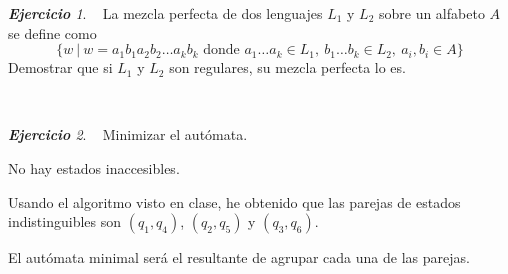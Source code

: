 \documentclass[12pt,spanish]{article}
\theoremstyle{definition}
\theoremstyle{remark}
\newtheorem{exercise}{\textbf{Ejercicio}}%
\begin{document}
\begin{exercise}~ La mezcla perfecta de dos lenguajes $L_1$ y $L_2$
  sobre un alfabeto $A$ se define como
  \[\{w \ | \ w=a_1b_1a_2b_2\ldots a_kb_k \text{ donde } a_1\ldots a_k
    \in L_1, \ b_1\ldots b_k \in L_2, \ a_i,b_i \in A\}\] Demostrar
  que si $L_1$ y $L_2$ son regulares, su mezcla perfecta lo es. \\
  
\end{exercise}

~

\begin{exercise}~ Minimizar el autómata. \\
\vspace{-7mm}
  \begin{figure}[H]
    \centering
  \end{figure}
  \vspace{-7mm}
  
  No hay estados inaccesibles.
  
  Usando el algoritmo visto en clase, he obtenido que las parejas de
  estados indistinguibles son $(q_1,q_4)$, $(q_2,q_5)$ y $(q_3,q_6)$.

  El autómata minimal será el resultante de agrupar cada una de las
  parejas.

  \begin{figure}[H]
    \centering
  \end{figure}
  
\end{exercise}
\end{document}
